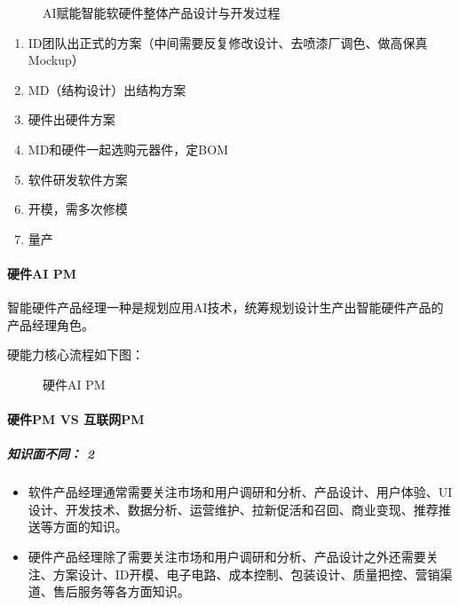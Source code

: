 \documentclass[letterpaper,11pt,english]{sphinxmanual}
\begin{document}
\begin{figure}[H]
\centering
\capstart

\noindent{}
\caption{AI赋能智能软硬件整体产品设计与开发过程}\label{\detokenize{chapter_project/AI_hardware:id31}}\end{figure}
\begin{enumerate}
%
\item {} 
ID团队出正式的方案（中间需要反复修改设计、去喷漆厂调色、做高保真Mockup）

\item {} 
MD（结构设计）出结构方案

\item {} 
硬件出硬件方案

\item {} 
MD和硬件一起选购元器件，定BOM

\item {} 
软件研发软件方案

\item {} 
开模，需多次修模

\item {} 
量产

\end{enumerate}


\paragraph{硬件AI PM}
\label{\detokenize{chapter_project/AI_hardware:ai-pm}}
智能硬件产品经理一种是规划应用AI技术，统筹规划设计生产出智能硬件产品的产品经理角色。

硬能力核心流程如下图：

\begin{figure}[H]
\centering
\capstart

\noindent{}
\caption{硬件AI PM}\label{\detokenize{chapter_project/AI_hardware:id32}}\end{figure}


\paragraph{硬件PM VS 互联网PM}
\label{\detokenize{chapter_project/AI_hardware:pm-vs-pm}}

\subparagraph{知识面不同： 2\sphinxfootnotemark[714]}
\label{\detokenize{chapter_project/AI_hardware:id3}}%
\begin{footnotetext}[714]\sphinxAtStartFootnote
{}
%
\end{footnotetext}\ignorespaces \begin{itemize}
\item {} 
软件产品经理通常需要关注市场和用户调研和分析、产品设计、用户体验、UI设计、开发技术、数据分析、运营维护、拉新促活和召回、商业变现、推荐推送等方面的知识。

\item {} 
硬件产品经理除了需要关注市场和用户调研和分析、产品设计之外还需要关注、方案设计、ID开模、电子电路、成本控制、包装设计、质量把控、营销渠道、售后服务等各方面知识。

\end{itemize}
\end{document}
